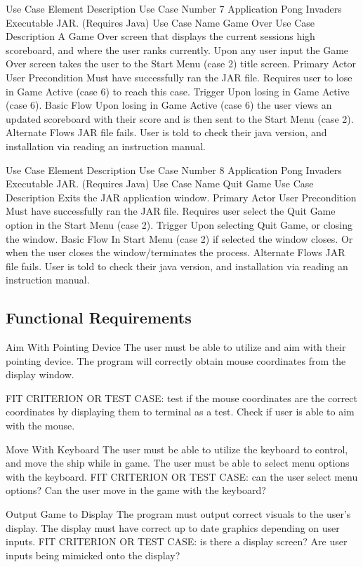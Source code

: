 \documentclass[12pt, titlepage]{article}
\begin{document}
Use Case Element
Description
Use Case Number
7
Application
Pong Invaders Executable JAR. (Requires Java)
Use Case Name
Game Over
Use Case Description
A Game Over screen that displays the current sessions high scoreboard, and where the user ranks currently. Upon any user input the Game Over screen takes the user to the Start Menu (case 2) title screen.
Primary Actor
User 
Precondition
Must have successfully ran the JAR file. Requires user to lose in Game Active (case 6) to reach this case.
Trigger
Upon losing in Game Active (case 6).
Basic Flow
Upon losing in Game Active (case 6) the user views an updated scoreboard with their score and is then sent to the Start Menu (case 2).
Alternate Flows
JAR file fails. User is told to check their java version, and installation via reading an instruction manual.


Use Case Element
Description
Use Case Number
8
Application
Pong Invaders Executable JAR. (Requires Java)
Use Case Name
Quit Game
Use Case Description
Exits the JAR application window.
Primary Actor
User 
Precondition
Must have successfully ran the JAR file. Requires user select the Quit Game option in the Start Menu (case 2).
Trigger
Upon selecting Quit Game, or closing the window.
Basic Flow
In Start Menu (case 2) if selected the window closes. Or when the user closes the window/terminates the process.
Alternate Flows
JAR file fails. User is told to check their java version, and installation via reading an instruction manual.

\subsection{Functional Requirements}
Aim With Pointing Device
The user must be able to utilize and aim with their pointing device. The program will correctly obtain mouse coordinates from the display window.

FIT CRITERION OR TEST CASE: test if the mouse coordinates are the correct coordinates by displaying them to terminal as a test. Check if user is able to aim with the mouse.


Move With Keyboard
The user must be able to utilize the keyboard to control, and move the ship while in game. The user must be able to select menu options with the keyboard.
FIT CRITERION OR TEST CASE: can the user select menu options? Can the user move in the game with the keyboard?


Output Game to Display
The program must output correct visuals to the user’s display. The display must have correct up to date graphics depending on user inputs.
FIT CRITERION OR TEST CASE: is there a display screen? Are user inputs being mimicked onto the display?
\end{document}
